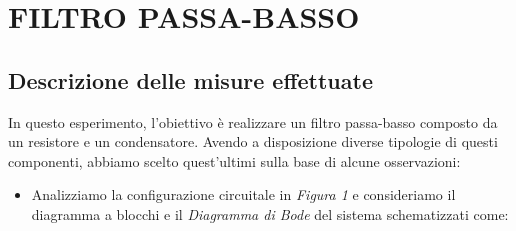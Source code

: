 \documentclass{article}
\begin{document}
\newpage

\section{FILTRO PASSA-BASSO}

\subsection{Descrizione delle misure effettuate}
  In questo esperimento, l’obiettivo è realizzare un filtro passa-basso composto da
  un resistore e un condensatore. Avendo a disposizione diverse tipologie di questi
  componenti, abbiamo scelto quest'ultimi sulla base di alcune osservazioni:
  \begin{itemize}
    \item Analizziamo la configurazione circuitale in \textit{Figura 1} e consideriamo il diagramma a blocchi e il \textit{Diagramma di Bode}
          del sistema schematizzati come:
          \begin{figure}[H]
            \centering
\end{figure}
\end{itemize}
\end{document}
